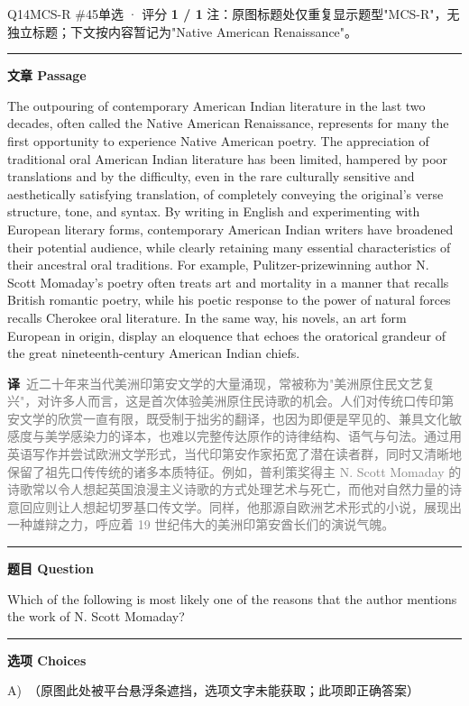 \documentclass[11pt]{article}
\newcommand{\ptesub}[1]{%
  \par\needspace{2\baselineskip}\smallskip
  {\color{cAccent}\rule[-0.2ex]{3pt}{1.05em}}\hspace{6pt}%
  {\bfseries\color{cHead}#1}\par\nopagebreak\smallskip}
\newcommand{\zh}[1]{{\footnotesize\textcolor{cNote}{\textbf{译}}\ \textcolor{gray}{#1}}}
\begin{document}
\begin{qblock}{Q14\quad MCS-R \#45}{单选 · 评分 \textcolor{cAccent}{\bfseries 1 / 1}}
{\footnotesize\color{gray} 注：原图标题处仅重复显示题型"MCS-R"，无独立标题；下文按内容暂记为"Native American Renaissance"。}
\ptesub{文章 Passage}
\begin{promptbox}
The outpouring of contemporary American Indian literature in the last two decades, often called the Native American Renaissance, represents for many the first opportunity to experience Native American poetry. The appreciation of traditional oral American Indian literature has been limited, hampered by poor translations and by the difficulty, even in the rare culturally sensitive and aesthetically satisfying translation, of completely conveying the original's verse structure, tone, and syntax. By writing in English and experimenting with European literary forms, contemporary American Indian writers have broadened their potential audience, while clearly retaining many essential characteristics of their ancestral oral traditions. For example, Pulitzer-prizewinning author N. Scott Momaday's poetry often treats art and mortality in a manner that recalls British romantic poetry, while his poetic response to the power of natural forces recalls Cherokee oral literature. In the same way, his novels, an art form European in origin, display an eloquence that echoes the oratorical grandeur of the great nineteenth-century American Indian chiefs.
\end{promptbox}
\zh{近二十年来当代美洲印第安文学的大量涌现，常被称为"美洲原住民文艺复兴"，对许多人而言，这是首次体验美洲原住民诗歌的机会。人们对传统口传印第安文学的欣赏一直有限，既受制于拙劣的翻译，也因为即便是罕见的、兼具文化敏感度与美学感染力的译本，也难以完整传达原作的诗律结构、语气与句法。通过用英语写作并尝试欧洲文学形式，当代印第安作家拓宽了潜在读者群，同时又清晰地保留了祖先口传传统的诸多本质特征。例如，普利策奖得主 N. Scott Momaday 的诗歌常以令人想起英国浪漫主义诗歌的方式处理艺术与死亡，而他对自然力量的诗意回应则让人想起切罗基口传文学。同样，他那源自欧洲艺术形式的小说，展现出一种雄辩之力，呼应着 19 世纪伟大的美洲印第安酋长们的演说气魄。}
\ptesub{题目 Question}
\begin{notebox}Which of the following is most likely one of the reasons that the author mentions the work of N. Scott Momaday?\end{notebox}
\ptesub{选项 Choices}
{\small
A)\ {\color{gray}（原图此处被平台悬浮条遮挡，选项文字未能获取；此项即正确答案）}\\
}
\end{qblock}
\end{document}

